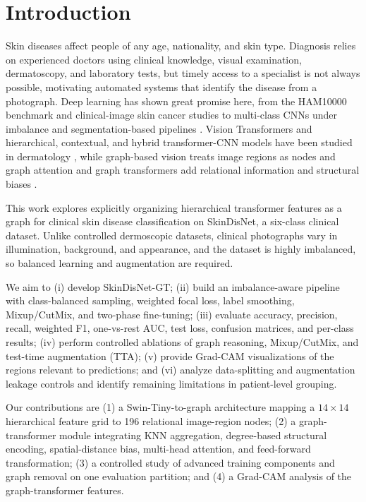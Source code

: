 \documentclass[conference]{IEEEtran}
\begin{document}
\section{Introduction}
Skin diseases affect people of any age, nationality, and skin type. Diagnosis relies on experienced doctors using clinical knowledge, visual examination, dermatoscopy, and laboratory tests, but timely access to a specialist is not always possible, motivating automated systems that identify the disease from a photograph. Deep learning has shown great promise here, from the HAM10000 benchmark \cite{ref1} and clinical-image skin cancer studies \cite{ref2} to multi-class CNNs under imbalance \cite{ref3} and segmentation-based pipelines \cite{ref4}. Vision Transformers \cite{ref5} and hierarchical, contextual, and hybrid transformer-CNN models have been studied in dermatology \cite{ref7,ref8,ref9}, while graph-based vision treats image regions as nodes \cite{ref6,ref11} and graph attention and graph transformers add relational information and structural biases \cite{ref12,ref13}.

This work explores explicitly organizing hierarchical transformer features as a graph for clinical skin disease classification on SkinDisNet, a six-class clinical dataset. Unlike controlled dermoscopic datasets, clinical photographs vary in illumination, background, and appearance, and the dataset is highly imbalanced, so balanced learning and augmentation are required.

We aim to (i) develop SkinDisNet-GT; (ii) build an imbalance-aware pipeline with class-balanced sampling, weighted focal loss, label smoothing, Mixup/CutMix, and two-phase fine-tuning; (iii) evaluate accuracy, precision, recall, weighted F1, one-vs-rest AUC, test loss, confusion matrices, and per-class results; (iv) perform controlled ablations of graph reasoning, Mixup/CutMix, and test-time augmentation (TTA); (v) provide Grad-CAM visualizations of the regions relevant to predictions; and (vi) analyze data-splitting and augmentation leakage controls and identify remaining limitations in patient-level grouping.

Our contributions are (1) a Swin-Tiny-to-graph architecture mapping a $14\times14$ hierarchical feature grid to 196 relational image-region nodes; (2) a graph-transformer module integrating KNN aggregation, degree-based structural encoding, spatial-distance bias, multi-head attention, and feed-forward transformation; (3) a controlled study of advanced training components and graph removal on one evaluation partition; and (4) a Grad-CAM analysis of the graph-transformer features.
\end{document}
